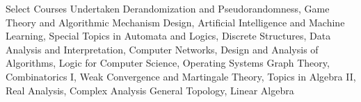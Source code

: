 \begin{rubric}{Select Courses Undertaken}
		Derandomization and Pseudorandomness, Game Theory and Algorithmic Mechanism Design, Artificial Intelligence and Machine Learning, Special Topics in Automata and Logics, Discrete Structures, Data Analysis and Interpretation, Computer Networks, Design and Analysis of Algorithms, Logic for Computer Science, Operating Systems
	\entry*[Mathematics]
		Graph Theory, Combinatorics I, Weak Convergence and Martingale Theory, Topics in Algebra II, Real Analysis, Complex Analysis General Topology, Linear Algebra
\end{rubric}